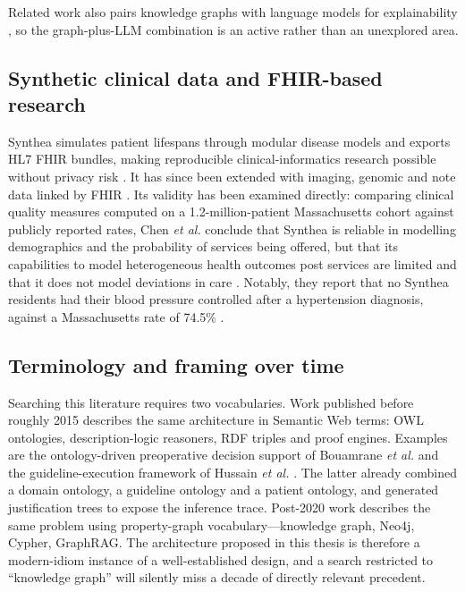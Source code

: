 Related work also pairs knowledge graphs with language models for explainability
\cite{park2025}, so the graph-plus-LLM combination is an active rather than an
unexplored area.

\subsection{Synthetic clinical data and FHIR-based research}
Synthea simulates patient lifespans through modular disease models and exports HL7 FHIR
bundles, making reproducible clinical-informatics research possible without privacy risk \cite{walonoski2017}. It has since been extended with imaging, genomic and note data
linked by FHIR \cite{walonoski2022}. Its validity has been examined
directly: comparing clinical quality measures computed on a 1.2-million-patient
Massachusetts cohort against publicly reported rates, Chen \textit{et al.} conclude that
Synthea is reliable in modelling demographics and the probability of
services being offered, but that its capabilities to model heterogeneous
health outcomes post services are limited and that it does not model
deviations in care \cite{chen2019}. Notably, they report that
no Synthea residents had their blood pressure controlled after a
hypertension diagnosis, against a Massachusetts rate of 74.5\%
\cite{chen2019}.

\subsection{Terminology and framing over time}
Searching this literature requires two vocabularies. Work published before roughly 2015
describes the same architecture in Semantic Web terms: OWL ontologies, description-logic
reasoners, RDF triples and proof engines. Examples are the ontology-driven preoperative
decision support of Bouamrane \textit{et al.} \cite{bouamrane2011} and the
guideline-execution framework of Hussain \textit{et al.} \cite{hussain2007}. The latter
already combined a domain ontology, a guideline ontology and a patient ontology, and
generated justification trees to expose the inference trace. Post-2020 work describes the same problem
using property-graph vocabulary---knowledge graph, Neo4j, Cypher, GraphRAG. The
architecture proposed in this thesis is therefore a modern-idiom instance of a
well-established design, and a search restricted to ``knowledge graph'' will silently miss
a decade of directly relevant precedent.

